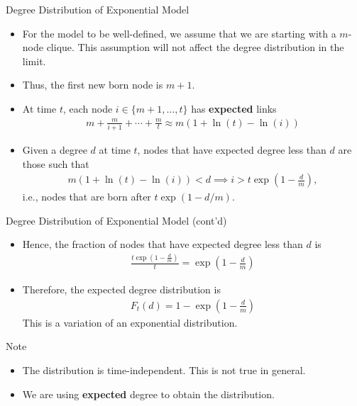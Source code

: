 \documentclass{beamer}
\begin{document}
\begin{frame}{Degree Distribution of Exponential Model}
	\begin{itemize}
		\item
			For the model to be well-defined,
			we assume that we are starting with a $m$-node clique.
			This assumption will not affect the degree distribution in the limit.
		\item
			Thus, the first new born node is $m+1$.
		\item
			At time $t$,
			each node $i\in\{m+1,...,t\}$ has \textbf{expected} links
			\begin{align*}
				m+\frac{m}{i+1}+\cdots+\frac{m}{t}
				\approx
				m\left(1+\ln(t)-\ln(i)\right)
			\end{align*}
		\item
			Given a degree $d$ at time $t$,
			nodes that have expected degree less than $d$ are those such that
			\begin{align*}
				m\left(1+\ln(t)-\ln(i)\right) < d
				\implies i > t\exp\left(1-\frac{d}{m}\right),
			\end{align*}
			i.e., nodes that are born after $t\exp(1-d/m)$.
	\end{itemize}
\end{frame}

\begin{frame}{Degree Distribution of Exponential Model (cont'd)}
	\begin{itemize}
		\item
			Hence, the fraction of nodes that have expected degree less than $d$ is
			\begin{align*}
				\frac{t\exp\left(1-\frac{d}{m}\right)}{t}
				= \exp\left(1-\frac{d}{m}\right)
			\end{align*}
		\item
			Therefore, the expected degree distribution is
			\begin{align}\label{eq:degree_distribution_direct}
				F_t(d)
				= 1 - \exp\left(1-\frac{d}{m}\right)
			\end{align}
			This is a variation of an exponential distribution.
	\end{itemize}
	\begin{block}{Note}
		\begin{itemize}
			\item The distribution is time-independent. This is not true in general.
			\item We are using \textbf{expected} degree to obtain the distribution.
		\end{itemize}
	\end{block}
\end{frame}
\end{document}
